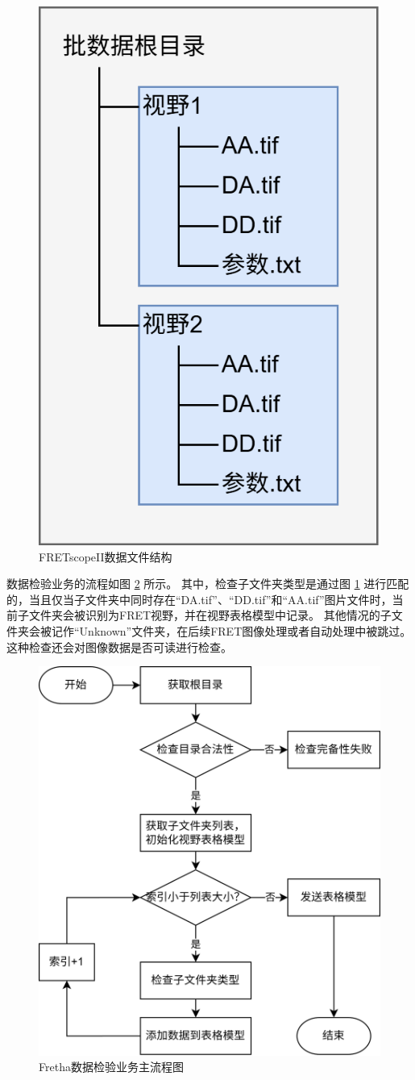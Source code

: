 \begin{figure}[htbp]
    \centering
    \includegraphics[height=0.5\linewidth]{../figures/2/2_FRETscopeII数据格式.drawio.png}
    \caption{FRETscopeII数据文件结构}
    \label{fig:fretscope_data_struct}
\end{figure}

数据检验业务的流程如图 \ref{fig:fretha_data_check_flow} 所示。
其中，检查子文件夹类型是通过图 \ref{fig:fretscope_data_struct} 进行匹配的，当且仅当子文件夹中同时存在“DA.tif”、“DD.tif”和“AA.tif”图片文件时，当前子文件夹会被识别为FRET视野，并在视野表格模型中记录。
其他情况的子文件夹会被记作“Unknown”文件夹，在后续FRET图像处理或者自动处理中被跳过。
这种检查还会对图像数据是否可读进行检查。
\begin{figure}[htbp]
    \centering
    \includegraphics[width=0.6\linewidth]{../figures/2/2_数据完备性检验业务.drawio.png}
    \caption{Fretha数据检验业务主流程图}
    \label{fig:fretha_data_check_flow}
\end{figure}

